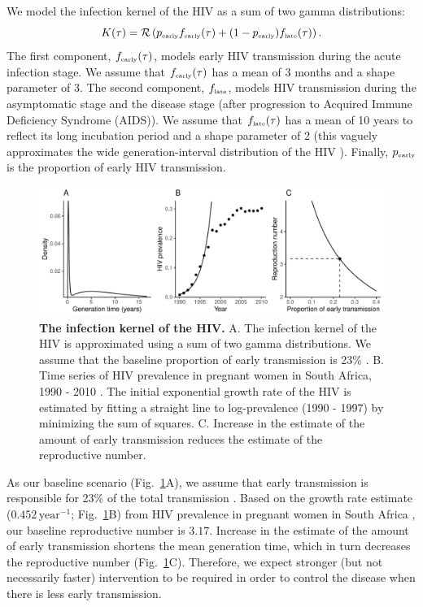 \documentclass[12pt]{article}
\newcommand{\tsub}[2]{#1_{{\textrm{\tiny #2}}}}
\newcommand{\figref}[1]{Fig.~\ref{fig:#1}}
\newcommand{\figlab}[1]{\label{fig:#1}}
\begin{document}
We model the infection kernel of the HIV as a sum of two gamma distributions:
\begin{equation}
K(\tau) = \mathcal R \left(\tsub{p}{early} \tsub{f}{early}(\tau) + (1-\tsub{p}{early}) \tsub{f}{late}(\tau) \right).
\end{equation}
The first component, $\tsub{f}{early}(\tau)$, models early HIV transmission during the acute infection stage.
We assume that $\tsub{f}{early}(\tau)$ has a mean of 3 months \citep{hollingsworth2008hiv} and a shape parameter of 3.
The second component, $\tsub{f}{late}$, models HIV transmission during the asymptomatic stage and the disease stage (after progression to Acquired Immune Deficiency Syndrome (AIDS)).
We assume that $\tsub{f}{late}(\tau)$ has a mean of 10 years to reflect its long incubation period \citep{brookmeyer1989censoring, nishiura2019estimating} and a shape parameter of 2 (this vaguely approximates the wide generation-interval distribution of the HIV \citep{fraser2004factors}).
Finally, $\tsub{p}{early}$ is the proportion of early HIV transmission.

\begin{figure}[!t]
\includegraphics[width=\textwidth]{../figure/HIV.pdf}
\caption{
\textbf{The infection kernel of the HIV.}
A. The infection kernel of the HIV is approximated using a sum of two gamma distributions. We assume that the baseline proportion of early transmission is 23\% \citep{hayes2006amplified}.
B. Time series of HIV prevalence in pregnant women in South Africa, 1990 - 2010 \citep{barron2013eliminating}. The initial exponential growth rate of the HIV is estimated by fitting a straight line to log-prevalence (1990 - 1997) by minimizing the sum of squares.
C. Increase in the estimate of the amount of early transmission reduces the estimate of the reproductive number.
}
\figlab{example}
\end{figure}

As our baseline scenario (\figref{example}A), we assume that early transmission is responsible for 23\% of the total transmission \citep{hayes2006amplified}.
Based on the growth rate estimate ($0.452\,\mathrm{year}^{-1}$; \figref{example}B) from HIV prevalence in pregnant women in South Africa \citep{barron2013eliminating}, our baseline reproductive number is $3.17$.
Increase in the estimate of the amount of early transmission shortens the mean generation time, which in turn decreases the reproductive number (\figref{example}C).
Therefore, we expect stronger (but not necessarily faster) intervention to be required in order to control the disease when there is less early transmission.
\end{document}
